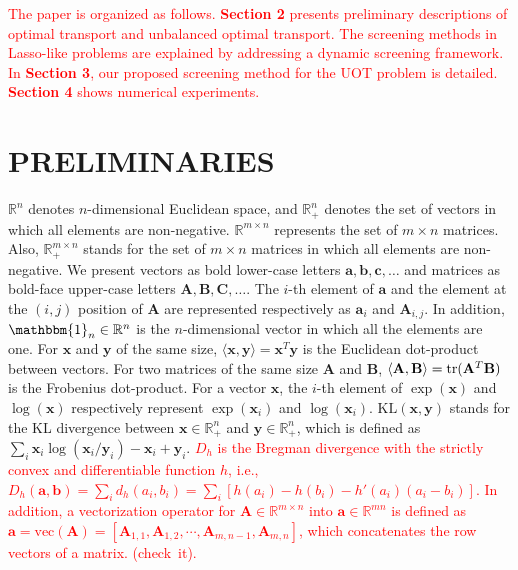 \documentclass[twoside]{article}
\theoremstyle{plain}
\newcommand{\one}{\mathbbm{1}}
\newcommand{\mat}[1]{\mathbf{#1}}
\renewcommand{\vec}[1]{\bm{#1}}
\newcommand{\changeHK}[1]{\textcolor{red}{#1}}
\begin{document}
\changeHK{The paper is organized as follows. {\bf Section 2} presents preliminary descriptions of optimal transport and unbalanced optimal transport. The screening methods in Lasso-like problems are explained by addressing a dynamic screening framework. In {\bf Section 3}, our proposed screening method for the UOT problem is detailed.  {\bf Section 4} shows numerical experiments. }

\section{PRELIMINARIES}

$\mathbb{R}^n$ denotes $n$-dimensional Euclidean space, and $\mathbb{R}^n_+$ denotes the set of vectors in which all elements are non-negative. $\mathbb{R}^{m \times n}$ represents the set of $m \times n$ matrices. Also, $\mathbb{R}^{m \times n}_+$ stands for the set of $m \times n$ matrices in which all elements are non-negative. We present vectors as bold lower-case letters $\vec{a},\vec{b},\vec{c},\dots$ and matrices as bold-face upper-case letters $\mat{A},\mat{B},\mat{C},\dots$. The $i$-th element of $\vec{a}$ and the element at the $(i,j)$ position of $\mat{A}$ are represented respectively as $\vec{a}_i$ and $\mat{A}_{i,j}$. In addition, $\one_n \in \mathbb{R}^n$ is the $n$-dimensional vector in which all the elements are one. For $\vec{x}$ and $\vec{y}$ of the same size, $\langle \vec{x},\vec{y} \rangle = \vec{x}^T\vec{y}$ is the Euclidean dot-product between vectors. For two matrices of the same size $\mat{A}$ and $\mat{B}$, $\langle \mat{A},\mat{B}\rangle={\rm tr}(\mat{A}^T\mat{B})$ is the Frobenius dot-product. For a vector $\vec{x}$, the $i$-th element of $\exp (\vec{x})$ and $\log (\vec{x})$ respectively represent $\exp (\vec{x}_i)$ and $\log (\vec{x}_i)$. $\mathrm{KL}(\vec{x},\vec{y})$ stands for the KL divergence between $\vec{x} \in \mathbb{R}_+^n$ and $\vec{y} \in \mathbb{R}_+^n$, which is defined as $\sum_i \vec{x}_i \log {(\vec{x}_i/\vec{y}_i)} - \vec{x}_i + \vec{y}_i$. \changeHK{$D_h$ is the Bregman divergence with the strictly convex and differentiable function $h$, i.e., $D_h(\vec{a},\vec{b})=\sum_{i} d_h(a_i, b_i)=\sum_i [h(a_i) - h(b_i) - h'(a_i)(a_i -b_i)]$. In addition, a vectorization operator for $\mat{A} \in \mathbb{R}^{m \times n}$ into $\vec{a} \in \mathbb{R}^{mn}$ is defined as $\vec{a}=\text{vec}(\mat{A})=[\mat{A}_{1,1}, \mat{A}_{1,2}, \cdots, \mat{A}_{m,n-1}, \mat{A}_{m,n}]$, which concatenates the row vectors of a matrix. (check\ it).}
 
\end{document}
